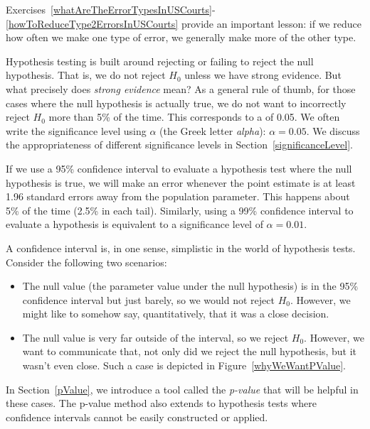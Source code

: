 
Exercises~\ref{whatAreTheErrorTypesInUSCourts}-\ref{howToReduceType2ErrorsInUSCourts} provide an important lesson: if we reduce how often we make one type of error, we generally make more of the other type.

Hypothesis testing is built around rejecting or failing to reject the null hypothesis. That is, we do not reject $H_0$ unless we have strong evidence. But what precisely does \emph{strong evidence} mean? As a general rule of thumb, for those cases where the null hypothesis is actually true, we do not want to incorrectly reject $H_0$ more than 5\% of the time. This corresponds to a  of 0.05. We often write the significance level using $\alpha$ (the Greek letter \emph{alpha}): $\alpha = 0.05$. We discuss the appropriateness of different significance levels in Section~\ref{significanceLevel}.

If we use a 95\% confidence interval to evaluate a hypothesis test where the null hypothesis is true, we will make an error whenever the point estimate is at least 1.96 standard errors away from the population parameter. This happens about 5\% of the time (2.5\% in each tail). Similarly, using a 99\% confidence interval to evaluate a hypothesis is equivalent to a significance level of $\alpha = 0.01$.

A confidence interval is, in one sense, simplistic in the world of hypothesis tests. Consider the following two scenarios:
\begin{itemize}
\setlength{\itemsep}{0mm}
\item The null value (the parameter value under the null hypothesis) is in the 95\% confidence interval but just barely, so we would not reject $H_0$. However, we might like to somehow say, quantitatively, that it was a close decision.
\item The null value is very far outside of the interval, so we reject $H_0$. However, we want to communicate that, not only did we reject the null hypothesis, but it wasn't even close. Such a case is depicted in Figure~\ref{whyWeWantPValue}.
\end{itemize}
In Section~\ref{pValue}, we introduce a tool called the \emph{p-value} that will be helpful in these cases. The p-value method also extends to hypothesis tests where confidence intervals cannot be easily constructed or applied.

